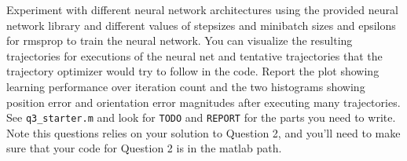 \documentclass{article}
\begin{document}
Experiment with different neural network architectures using the provided neural network library and different values of stepsizes and minibatch sizes and epsilons for rmsprop to train the neural network.
You can visualize the resulting trajectories for executions of the neural net and tentative trajectories that the trajectory optimizer would try to follow in the code.
Report the plot showing learning performance over iteration count and the two histograms showing position error and orientation error magnitudes after executing many trajectories.
\\

See \verb|q3_starter.m| and look for \verb|TODO| and \verb|REPORT| for the parts you need to write.
Note this questions relies on your solution to Question 2, and you'll need to make sure that your code for Question 2 is in the matlab path.









\end{document}
